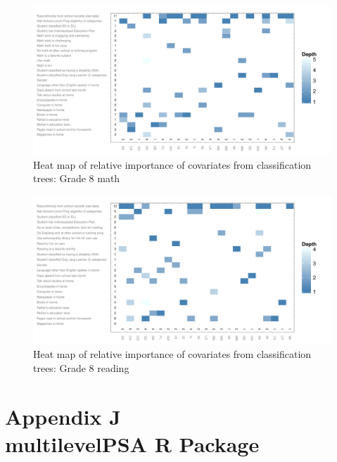 \begin{figure}[h!]
\begin{center}
\includegraphics[height=.37\textheight]{../Figures2009/g8math-mlpsa-ctree-heat.pdf}
\caption{Heat map of relative importance of covariates from classification trees: Grade 8 math}
\label{fig:g8math-mlpsa-ctree-heat}
\end{center}
\end{figure}

\begin{figure}[h!]
\begin{center}
\includegraphics[height=.37\textheight]{../Figures2009/g8read-mlpsa-ctree-heat.pdf}
\caption{Heat map of relative importance of covariates from classification trees: Grade 8 reading}
\label{fig:g8read-mlpsa-ctree-heat}
\end{center}
\end{figure}


\clearpage
{}
\section*{Appendix J\\multilevelPSA R Package}
\label{multilevelPSAPackage}

